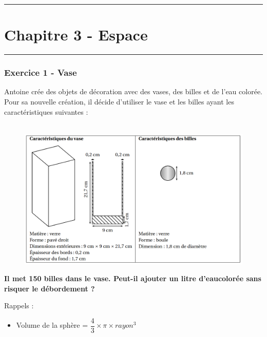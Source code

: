 \documentclass[11pt]{article}
\newcommand{\horrule}[1]{\rule{\linewidth}{#1}} %
\begin{document}

\newtheorem{Definition}{Définition}
\newtheorem{Theorem}{Théorème}
\newtheorem{Proposition}{Propriété}

\renewcommand{\labelitemi}{$\bullet$}
\renewcommand{\labelitemii}{$\circ$}

\setlength{\columnseprule}{1pt}

\horrule{2px}
\section*{Chapitre 3 - Espace}
\horrule{2px}
\vspace{-1cm}

\subsubsection*{Exercice 1 - Vase}

Antoine crée des objets de décoration avec des vases, des billes et de l’eau colorée. Pour sa nouvelle création, il décide d’utiliser le vase et les billes ayant les caractéristiques suivantes :

\begin{figure}[H]
      \centering
      \includegraphics[width=0.7\linewidth]{3x3-volumes-1/sources/bille.png}
\end{figure}

\textbf{Il met 150 billes dans le vase. Peut-il ajouter un litre d’eaucolorée sans risquer le débordement ?}

Rappels : 

\begin{itemize}
\item Volume de la sphère = $\dfrac{4}{3} \times \pi  \times rayon^3$
\end{itemize}
\end{document}
